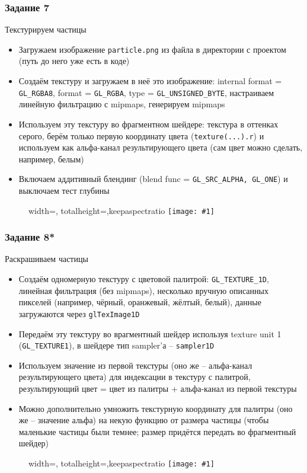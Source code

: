 \documentclass{beamer}
\newcommand{\slideimage}[1]{
  \begin{figure}
    \begin{adjustbox}{width=\textwidth, totalheight=\textheight-2\baselineskip-2\baselineskip,keepaspectratio}
      \texttt{[image: \#1]}
    \end{adjustbox}
  \end{figure}
}
\begin{document}
\begin{frame}[fragile]
\frametitle{Задание 7}
Текстурируем частицы
\begin{itemize}
\item Загружаем изображение \verb|particle.png| из файла в директории с проектом (путь до него уже есть в коде)
\item Создаём текстуру и загружаем в неё это изображение: internal format = \verb|GL_RGBA8|, format = \verb|GL_RGBA|, type = \verb|GL_UNSIGNED_BYTE|, настраиваем линейную фильтрацию с mipmaps, генерируем mipmaps
\item Используем эту текстуру во фрагментном шейдере: текстура в оттенках серого, берём только первую координату цвета (\verb|texture(...).r|) и используем как альфа-канал результирующего цвета (сам цвет можно сделать, например, белым)
\item Включаем аддитивный блендинг (blend func = \verb|GL_SRC_ALPHA, GL_ONE|) и выключаем тест глубины
\end{itemize}
\end{frame}

\begin{frame}[fragile]
\slideimage{7.png}
\end{frame}

\begin{frame}[fragile]
\frametitle{Задание 8*}
Раскрашиваем частицы
\begin{itemize}
\item Создаём одномерную текстуру с цветовой палитрой: \verb|GL_TEXTURE_1D|, линейная фильтрация (без mipmaps), несколько вручную описанных пикселей (например, чёрный, оранжевый, жёлтый, белый), данные загружаются через \verb|glTexImage1D|
\item Передаём эту текстуру во врагментный шейдер используя texture unit 1 (\verb|GL_TEXTURE1|), в шейдере тип sampler'а -- \verb|sampler1D|
\item Используем значение из первой текстуры (оно же -- альфа-канал результирующего цвета) для индексации в текстуру с палитрой, результирующий цвет = цвет из палитры + альфа-канал из первой текстуры
\item Можно дополнительно умножить текстурную координату для палитры (оно же -- значение альфа) на некую функцию от размера частицы (чтобы маленькие частицы были темнее; размер придётся передать во фрагментный шейдер)
\end{itemize}
\end{frame}

\begin{frame}[fragile]
\slideimage{8.png}
\end{frame}
\end{document}
